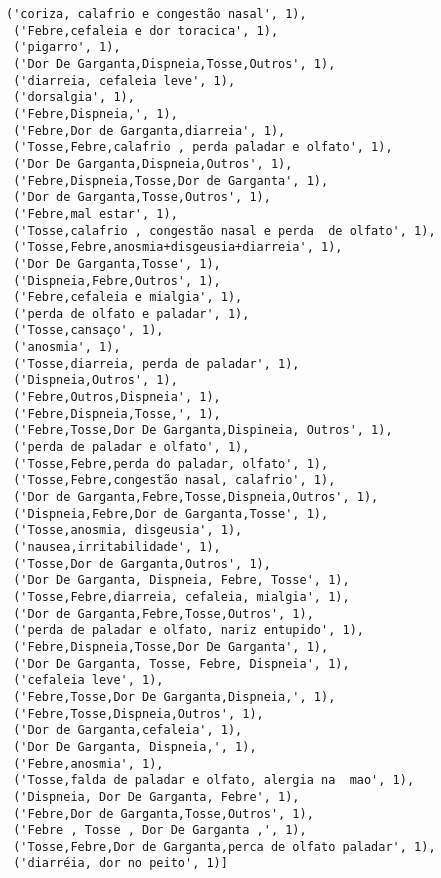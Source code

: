 \documentclass[11pt]{article}
\begin{document}
\begin{tcolorbox}[breakable, size=fbox, boxrule=.5pt, pad at break*=1mm, opacityfill=0]
\begin{Verbatim}[commandchars=\\\{\}]
 ('coriza, calafrio e congestão nasal', 1),
 ('Febre,cefaleia e dor toracica', 1),
 ('pigarro', 1),
 ('Dor De Garganta,Dispneia,Tosse,Outros', 1),
 ('diarreia, cefaleia leve', 1),
 ('dorsalgia', 1),
 ('Febre,Dispneia,', 1),
 ('Febre,Dor de Garganta,diarreia', 1),
 ('Tosse,Febre,calafrio , perda paladar e olfato', 1),
 ('Dor De Garganta,Dispneia,Outros', 1),
 ('Febre,Dispneia,Tosse,Dor de Garganta', 1),
 ('Dor de Garganta,Tosse,Outros', 1),
 ('Febre,mal estar', 1),
 ('Tosse,calafrio , congestão nasal e perda  de olfato', 1),
 ('Tosse,Febre,anosmia+disgeusia+diarreia', 1),
 ('Dor De Garganta,Tosse', 1),
 ('Dispneia,Febre,Outros', 1),
 ('Febre,cefaleia e mialgia', 1),
 ('perda de olfato e paladar', 1),
 ('Tosse,cansaço', 1),
 ('anosmia', 1),
 ('Tosse,diarreia, perda de paladar', 1),
 ('Dispneia,Outros', 1),
 ('Febre,Outros,Dispneia', 1),
 ('Febre,Dispneia,Tosse,', 1),
 ('Febre,Tosse,Dor De Garganta,Dispineia, Outros', 1),
 ('perda de paladar e olfato', 1),
 ('Tosse,Febre,perda do paladar, olfato', 1),
 ('Tosse,Febre,congestão nasal, calafrio', 1),
 ('Dor de Garganta,Febre,Tosse,Dispneia,Outros', 1),
 ('Dispneia,Febre,Dor de Garganta,Tosse', 1),
 ('Tosse,anosmia, disgeusia', 1),
 ('nausea,irritabilidade', 1),
 ('Tosse,Dor de Garganta,Outros', 1),
 ('Dor De Garganta, Dispneia, Febre, Tosse', 1),
 ('Tosse,Febre,diarreia, cefaleia, mialgia', 1),
 ('Dor de Garganta,Febre,Tosse,Outros', 1),
 ('perda de paladar e olfato, nariz entupido', 1),
 ('Febre,Dispneia,Tosse,Dor De Garganta', 1),
 ('Dor De Garganta, Tosse, Febre, Dispneia', 1),
 ('cefaleia leve', 1),
 ('Febre,Tosse,Dor De Garganta,Dispneia,', 1),
 ('Febre,Tosse,Dispneia,Outros', 1),
 ('Dor de Garganta,cefaleia', 1),
 ('Dor De Garganta, Dispneia,', 1),
 ('Febre,anosmia', 1),
 ('Tosse,falda de paladar e olfato, alergia na  mao', 1),
 ('Dispneia, Dor De Garganta, Febre', 1),
 ('Febre,Dor de Garganta,Tosse,Outros', 1),
 ('Febre , Tosse , Dor De Garganta ,', 1),
 ('Tosse,Febre,Dor de Garganta,perca de olfato paladar', 1),
 ('diarréia, dor no peito', 1)]
\end{Verbatim}
\end{tcolorbox}
        
\end{document}
